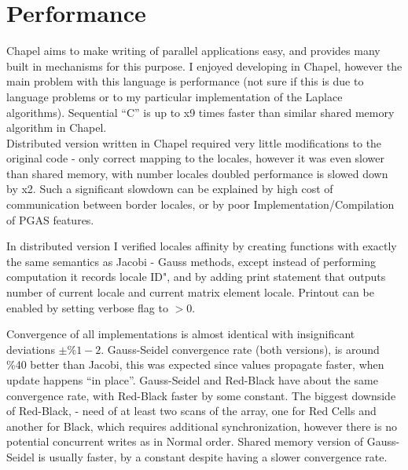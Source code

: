 \documentclass{article}
\begin{document}
\section{Performance}

Chapel aims to make writing of parallel applications easy, and provides many built in
mechanisms for this purpose. I enjoyed developing in Chapel, however the main problem with
this language is performance (not sure if this is due to language problems or to my
particular implementation of the Laplace algorithms). Sequential ``C'' is up to x9 times
faster than similar shared memory algorithm in Chapel. \\

Distributed version written in Chapel required very little modifications to the original
code - only correct mapping to the locales, however it was even slower than shared memory,
with number locales doubled performance is slowed down by x2.
Such a significant slowdown can be explained by high cost of communication between border
locales, or by poor Implementation/Compilation of PGAS features.

In distributed version I verified locales affinity by creating functions with exactly the
same semantics as Jacobi - Gauss methods, except instead of performing computation it records
locale ID", and by adding print statement that outputs number of current locale and current matrix
element locale. Printout can be enabled by setting verbose flag to $>0$.\\

\pagebreak

Convergence of all implementations is almost identical with insignificant deviations $\pm
\%1- 2$.
Gauss-Seidel convergence rate (both versions), is around \%40 better than Jacobi, this was
expected since values propagate faster, when update happens ``in place''. Gauss-Seidel and Red-Black
have about the same convergence rate, with Red-Black faster by some constant. The biggest downside
of Red-Black, - need of at least two scans of the array, one for Red Cells and another for Black, 
which requires additional synchronization, however there is no potential concurrent writes as in
Normal order.
Shared memory version of Gauss-Seidel is usually faster, by a constant despite having a slower
convergence rate. \\

\end{document}
